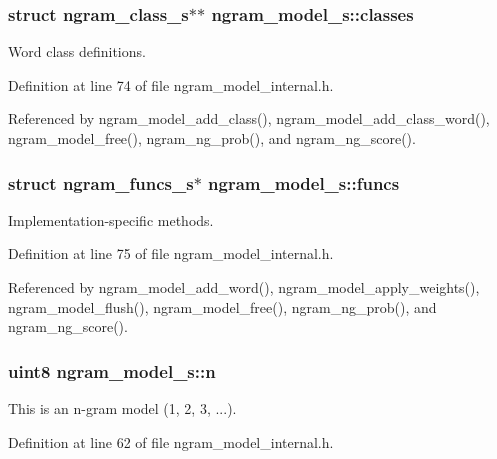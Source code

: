 \subsubsection[{classes}]{\setlength{\rightskip}{0pt plus 5cm}struct {\bf ngram\-\_\-class\-\_\-s}$\ast$$\ast$ ngram\-\_\-model\-\_\-s\-::classes}\label{structngram__model__s_a39384af3e6b53591d433436db011ac8d}


Word class definitions. 



Definition at line 74 of file ngram\-\_\-model\-\_\-internal.\-h.



Referenced by ngram\-\_\-model\-\_\-add\-\_\-class(), ngram\-\_\-model\-\_\-add\-\_\-class\-\_\-word(), ngram\-\_\-model\-\_\-free(), ngram\-\_\-ng\-\_\-prob(), and ngram\-\_\-ng\-\_\-score().

\subsubsection[{funcs}]{\setlength{\rightskip}{0pt plus 5cm}struct {\bf ngram\-\_\-funcs\-\_\-s}$\ast$ ngram\-\_\-model\-\_\-s\-::funcs}\label{structngram__model__s_ad3d9d8ad9773f958a89534220eda6fb9}


Implementation-\/specific methods. 



Definition at line 75 of file ngram\-\_\-model\-\_\-internal.\-h.



Referenced by ngram\-\_\-model\-\_\-add\-\_\-word(), ngram\-\_\-model\-\_\-apply\-\_\-weights(), ngram\-\_\-model\-\_\-flush(), ngram\-\_\-model\-\_\-free(), ngram\-\_\-ng\-\_\-prob(), and ngram\-\_\-ng\-\_\-score().

\subsubsection[{n}]{\setlength{\rightskip}{0pt plus 5cm}uint8 ngram\-\_\-model\-\_\-s\-::n}\label{structngram__model__s_a3c87bc1b678662a2c8930b3b8c33a80f}


This is an n-\/gram model (1, 2, 3, ...). 



Definition at line 62 of file ngram\-\_\-model\-\_\-internal.\-h.



